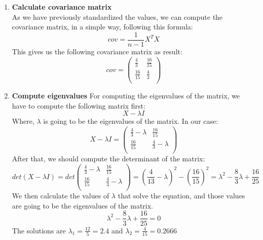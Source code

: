 \documentclass[12pt]{article}
\begin{document}
\begin{enumerate}
    \item \textbf{Calculate covariance matrix}\\
    As we have previously standardized the values, we can compute the covariance matrix, in a simple way, following this formula:
    \begin{equation}
        cov = \frac{1}{n-1}X^TX
    \end{equation}
    This gives us the following covariance matrix as result:
    \begin{equation}
    cov =
        \begin{pmatrix}
         \frac{4}{3} & \frac{16}{15} \\
          \frac{16}{15} &\frac{4}{3} \\
        \end{pmatrix}
    \end{equation}
    \item \textbf{Compute eigenvalues}      
    For computing the eigenvalues of the matrix, we have to compute the following matrix first:
    \begin{equation}
        X - \lambda I
    \end{equation}
    Where, $\lambda$ is going to be the eigenvalues of the matrix. In our case:
    \begin{equation}
        X - \lambda I =
        \begin{pmatrix}
         \frac{4}{3} - \lambda & \frac{16}{15} \\
          \frac{16}{15} &\frac{4}{3} - \lambda \\
        \end{pmatrix}
    \end{equation}
    After that, we should compute the determinant of the matrix:
    \begin{equation}
        det(X - \lambda I) = det\begin{pmatrix}
         \frac{4}{3} - \lambda & \frac{16}{15} \\
          \frac{16}{15} &\frac{4}{3} - \lambda \\
        \end{pmatrix} = (\frac{4}{13}-\lambda)^2-(\frac{16}{15})^2
        =\lambda^2-\frac{8}{3}\lambda+\frac{16}{25}
    \end{equation}
    We then calculate the values of $\lambda$ that solve the equation, and those values are going to be the eigenvalues of the matrix.
    \begin{equation}
        \lambda^2-\frac{8}{3}\lambda+\frac{16}{25}=0
    \end{equation}
    The solutions are $\lambda_1 = \frac{12}{5}=2.4$ and $\lambda_2=\frac{4}{15}=0.2666$
    

\end{enumerate}
\end{document}
